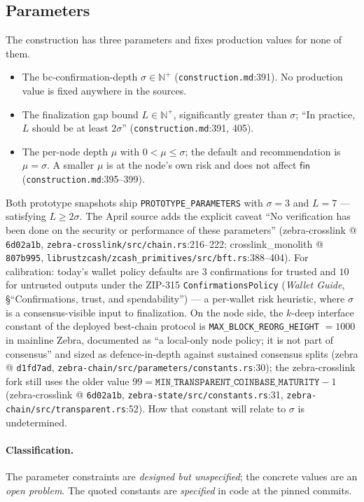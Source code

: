 \documentclass[11pt,a4paper]{article}
\theoremstyle{definition}
\newcommand{\N}{\mathbb{N}}
\begin{document}
\subsection{Parameters}\label{sec:xl-parameters}

The construction has three parameters and fixes production values for
none of them.
\begin{itemize}
\item The bc-confirmation-depth $\sigma \in \N^{+}$
  (\texttt{construction.md}:391). No production value is fixed anywhere
  in the sources.
\item The finalization gap bound $L \in \N^{+}$, significantly greater
  than $\sigma$; ``In practice, $L$ should be at least $2\sigma$''
  (\texttt{construction.md}:391, 405).
\item The per-node depth $\mu$ with $0 < \mu \le \sigma$; the default and
  recommendation is $\mu = \sigma$. A smaller $\mu$ is at the node's own
  risk and does not affect $\mathsf{fin}$
  (\texttt{construction.md}:395--399).
\end{itemize}
Both prototype snapshots ship \texttt{PROTOTYPE\_PARAMETERS} with
$\sigma = 3$ and $L = 7$ --- satisfying $L \ge 2\sigma$. The April source
adds the explicit caveat ``No verification has been done on the security
or performance of these parameters'' (zebra-crosslink @
\texttt{6d02a1b}, \texttt{zebra-crosslink/src/chain.rs}:216--222;
crosslink\_monolith @ \texttt{807b995},
\texttt{librustzcash/zcash\_primitives/src/bft.rs}:388--404).
For calibration: today's wallet policy defaults are $3$ confirmations for
trusted and $10$ for untrusted outputs under the ZIP-315
\texttt{ConfirmationsPolicy} (\emph{Wallet Guide}, \S``Confirmations,
trust, and spendability'') --- a per-wallet risk heuristic, where
$\sigma$ is a consensus-visible input to finalization. On the node side,
the $k$-deep interface constant of the deployed best-chain protocol is
\texttt{MAX\_BLOCK\_REORG\_HEIGHT} $= 1000$ in mainline Zebra, documented
as ``a local-only node policy; it is not part of consensus'' and sized as
defence-in-depth against sustained consensus splits (zebra @
\texttt{d1fd7ad}, \texttt{zebra-chain/src/parameters/constants.rs}:30);
the zebra-crosslink fork still uses the older value $99 =
\texttt{MIN\_TRANSPARENT\_COINBASE\_MATURITY} - 1$ (zebra-crosslink @
\texttt{6d02a1b}, \texttt{zebra-state/src/constants.rs}:31,
\texttt{zebra-chain/src/transparent.rs}:52). How that constant will
relate to $\sigma$ is undetermined.

\paragraph{Classification.} The parameter constraints are \emph{designed
but unspecified}; the concrete values are an \emph{open problem}. The
quoted constants are \emph{specified} in code at the pinned commits.
\end{document}
